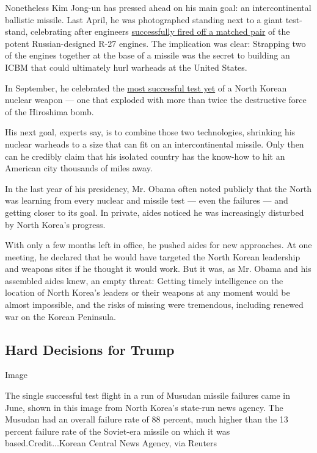 Nonetheless Kim Jong-un has pressed ahead on his main goal: an
intercontinental ballistic missile. Last April, he was photographed
standing next to a giant test-stand, celebrating after engineers
\href{http://www.globalsecurity.org/wmd/world/dprk/kn-14-first-stage-main-engine-cluster-static-test-firing-4-9-2016.htm}{successfully
fired off a matched pair} of the potent Russian-designed R-27 engines.
The implication was clear: Strapping two of the engines together at the
base of a missile was the secret to building an ICBM that could
ultimately hurl warheads at the United States.

In September, he celebrated the
\href{http://www.nti.org/analysis/articles/north-koreas-nuclear-year-reviewand-whats-next/}{most
successful test yet} of a North Korean nuclear weapon --- one that
exploded with more than twice the destructive force of the Hiroshima
bomb.

His next goal, experts say, is to combine those two technologies,
shrinking his nuclear warheads to a size that can fit on an
intercontinental missile. Only then can he credibly claim that his
isolated country has the know-how to hit an American city thousands of
miles away.

In the last year of his presidency, Mr. Obama often noted publicly that
the North was learning from every nuclear and missile test --- even the
failures --- and getting closer to its goal. In private, aides noticed
he was increasingly disturbed by North Korea's progress.

With only a few months left in office, he pushed aides for new
approaches. At one meeting, he declared that he would have targeted the
North Korean leadership and weapons sites if he thought it would work.
But it was, as Mr. Obama and his assembled aides knew, an empty threat:
Getting timely intelligence on the location of North Korea's leaders or
their weapons at any moment would be almost impossible, and the risks of
missing were tremendous, including renewed war on the Korean Peninsula.

\hypertarget{hard-decisions-for-trump}{%
\subsection{Hard Decisions for Trump}\label{hard-decisions-for-trump}}

Image

The single successful test flight in a run of Musudan missile failures
came in June, shown in this image from North Korea's state-run news
agency. The Musudan had an overall failure rate of 88 percent, much
higher than the 13 percent failure rate of the Soviet-era missile on
which it was based.Credit...Korean Central News Agency, via Reuters

